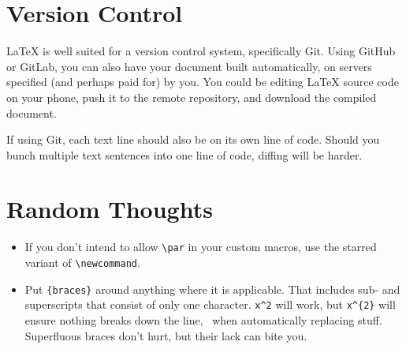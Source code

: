\section{Version Control}
\LaTeX{} is well suited for a version control system, specifically Git.
Using GitHub or GitLab, you can also have your document built automatically, on servers specified (and perhaps paid for) by you.
You could be editing \LaTeX{} source code on your phone, push it to the remote repository, and download the compiled document.

If using Git, each text line should also be on its own line of code.
Should you bunch multiple text sentences into one line of code, diffing will be harder.

\section{Random Thoughts}

\begin{itemize}
	\item If you don't intend to allow \verb|\par| in your custom macros, use the starred variant of \verb|\newcommand|.
	\item Put \verb|{braces}| around anything where it is applicable.
	That includes sub- and superscripts that consist of only one character.
	\verb|x^2| will work, but \verb|x^{2}| will ensure nothing breaks down the line, \ when automatically replacing stuff.
	Superfluous braces don't hurt, but their lack can bite you.
\end{itemize}
